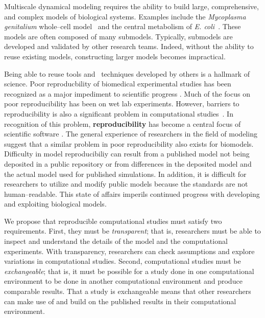 \documentclass[10pt,letterpaper]{article}
\begin{document}
Multiscale dynamical modeling requires the ability to build large, comprehensive, and complex models of biological systems. Examples include the \textit{Mycoplasma genitalium} whole--cell model~\cite{karr2012whole} and the central metabolism of \textit{E. coli}~\cite{millard2017metabolic}. These models are often composed of many submodels. Typically, submodels are developed and validated by other research teams. Indeed, without the ability to reuse existing models, constructing larger models becomes impractical. 

Being able to reuse tools and  techniques developed by others is a hallmark of science. Poor reproducbility of biomedical experimental studies has been recognized as a major impediment to scientific progress \cite{prinz2011believe,mobley2013survey}. Much of the focus on poor reproducibility has been on wet lab experiments. However, barriers to reproducibility is also a significant problem in computational studies~\cite{peng2016moving,medley2016guidelines,mcdougal2016reproducibility,waltemath2016modeling}. In recognition of this problem, \textbf{reproducibility} has become a central focus of scientific software \cite{peng2011reproducible,sandve2013ten}. The general experience of researchers in the field of modeling suggest that a similar problem in poor reproducibility also exists for biomodels.  Difficulty in model reproducibiliy can result from a published model not being deposited in a public repository or from differences in the deposited model and the actual model used for published simulations.  In addition, it is difficult for researchers to utilize and modify public models because the standards are not human--readable. This state of affairs imperils continued progress with developing and exploiting biological models.




We propose that reproducible computational studies must satisfy two requirements. First, they must be  \textit{transparent}; that is, researchers must be able to inspect and understand the details of the model and the computational experiments. With transparency, researchers can check assumptions and explore variations in computational studies. Second, computational studies must be  \textit{exchangeable}; that is, it must be possible for a study done in one computational environment to be done in another computational environment and produce comparable results. That a study is exchangeable means that other researchers can make use of and build on the published results in their computational environment.
\end{document}
